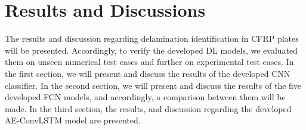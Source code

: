 
\chapter[Results and Discussions]{Results and Discussions}
\label{ch5}

The results and discussion regarding delamination identification in CFRP plates will be presented. 
Accordingly, to verify the developed DL models, we evaluated them on unseen numerical test cases and further on experimental test cases.
In the first section, we will present and discuss the results of the developed CNN classifier. 
In the second section, we will present and discuss the results of the five developed FCN models, and accordingly, a comparison between them will be made.
In the third section, the results, and discussion regarding the developed AE-ConvLSTM model are presented.






